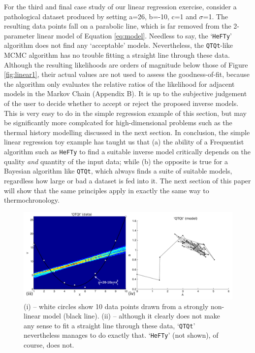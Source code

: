 \documentclass{article}
\begin{document}
For the third and final case study of our linear regression exercise,
consider a pathological dataset produced by setting a=26, b=-10, c=1
and $\sigma$=1. The resulting data points fall on a parabolic line,
which is far removed from the 2-parameter linear model of Equation
\ref{eq:model}. Needless to say, the `{\tt HeFTy}' algorithm does not
find any `acceptable' models. Nevertheless, the {\tt QTQt}-like MCMC
algorithm has no trouble fitting a straight line through these
data. Although the resulting likelihoods are orders of magnitude below
those of Figure \ref{fig:linear1}, their actual values are not used to
assess the goodness-of-fit, because the algorithm only evaluates the
relative ratios of the likelihood for adjacent models in the Markov
Chain (Appendix B).  It is up to the subjective judgement of the user
to decide whether to accept or reject the proposed inverse
models. This is very easy to do in the simple regression example of
this section, but may be significantly more complcated for
high-dimensional problems such as the thermal history modelling
discussed in the next section.  In conclusion, the simple linear
regression toy example has taught us that (a) the ability of a
Frequentist algorithm such as {\tt HeFTy} to find a suitable inverse
model critically depends on the quality {\it and} quantity of the
input data; while (b) the opposite is true for a Bayesian algorithm
like {\tt QTQt}, which always finds a suite of suitable models,
regardless how large or bad a dataset is fed into it.  The next
section of this paper will show that the same principles apply in
exactly the same way to thermochronology.

\begin{figure}[!ht]
\includegraphics[width=\textwidth]{fig6.png}
\caption{(i) -- white circles show 10 data points drawn from a
  strongly non-linear model (black line). (ii) -- although it clearly
  does not make any sense to fit a straight line through these data,
  `{\tt QTQt}' nevertheless manages to do exactly that. `{\tt HeFTy}'
  (not shown), of course, does not.}
\label{fig:linear5}
\end{figure}
\end{document}

